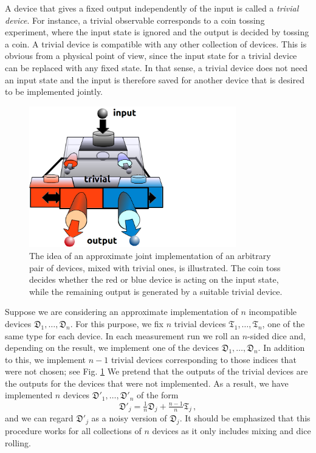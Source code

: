 \documentclass[12pt]{article}
\theoremstyle{definition}
\newcommand{\Dev}{\mathfrak{D}} %
\newcommand{\Triv}{\mathfrak{T}} %
\begin{document}
A device that gives a fixed output independently of the input is called a \emph{trivial device}.
For instance, a trivial observable corresponds to a coin tossing experiment, where the input state is ignored and the output is decided by tossing a coin. 
A trivial device is compatible with any other collection of devices.
This is obvious from a physical point of view, since the input state for a trivial device can be replaced with any fixed state.
In that sense, a trivial device does not need an input state and the input is therefore saved for another device that is desired to be implemented jointly.

\begin{figure}\begin{center}
\includegraphics[width=9cm]{fig_incomp_trivimix.png}
\caption{
The idea of an approximate joint implementation of an arbitrary pair of devices, mixed with trivial ones, is illustrated. The coin toss decides whether the red or blue device is acting on the input state, while the remaining output is generated by a suitable trivial device. }
\label{fig:trivimix}
\end{center}
\end{figure}

Suppose we are considering an approximate implementation of $n$ incompatible devices $\Dev_1,\ldots,\Dev_n$.
For this purpose, we fix $n$ trivial devices $\Triv_1,\ldots,\Triv_n$, one of the same type for each device.
In each measurement run we roll an $n$-sided dice and, depending on the result, we implement one of the devices $\Dev_1,\ldots,\Dev_n$.
In addition to this, we implement $n-1$ trivial devices corresponding to those indices that were not chosen; see Fig. \ref{fig:trivimix}
We pretend that the outputs of the trivial devices are the outputs for the devices that were not implemented.
As a result, we have implemented $n$ devices $\Dev'_1,\ldots,\Dev'_n$ of the form
\begin{equation}\label{eq:mixtoss}
\Dev'_j = \tfrac{1}{n} \Dev_j + \tfrac{n-1}{n} \Triv_j \, ,
\end{equation}
and we can regard $\Dev'_j$ as a noisy version of $\Dev_j$.
It should be emphasized that this procedure works for all collections of $n$ devices as it only includes mixing and dice rolling.
\end{document}
